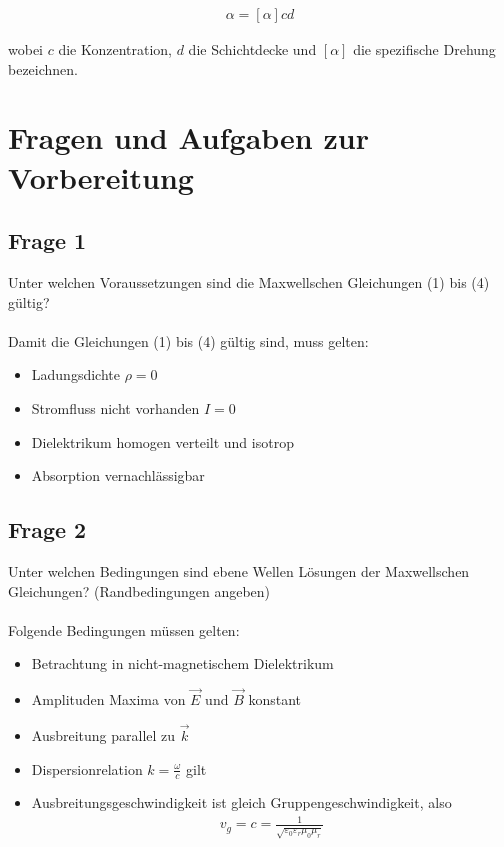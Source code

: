 \documentclass[a4paper,10pt]{scrartcl}
\begin{document}
			\begin{align}
			\alpha=[\alpha]cd
			\end{align} 
			
			wobei \(c\) die Konzentration, \(d\) die Schichtdecke und \([\alpha]\) die spezifische Drehung bezeichnen.
			
			\newpage
			
	\section{Fragen und Aufgaben zur Vorbereitung}
		\subsection{Frage 1}
			Unter welchen Voraussetzungen sind die Maxwellschen Gleichungen (1) bis (4) gültig?\\
			\\
			Damit die Gleichungen (1) bis (4) gültig sind, muss gelten:
			
			\begin{itemize}
				\item Ladungsdichte \(\rho=0\)
				\item Stromfluss nicht vorhanden \(I=0\)
				\item Dielektrikum homogen verteilt und isotrop
				\item Absorption vernachlässigbar
			\end{itemize}
			
		\subsection{Frage 2}
			Unter welchen Bedingungen sind ebene Wellen Lösungen der Maxwellschen Gleichungen?
			(Randbedingungen angeben)\\
			\\
			Folgende Bedingungen müssen gelten:
		
			\begin{itemize}
				\item Betrachtung in nicht-magnetischem Dielektrikum
				\item Amplituden Maxima von \(\vec{E}\) und \(\vec{B}\) konstant
				\item Ausbreitung parallel zu \(\vec{k}\)
				\item Dispersionrelation \(k=\frac{\omega}{c}\) gilt
				\item Ausbreitungsgeschwindigkeit ist gleich Gruppengeschwindigkeit, also\\
				\begin{align*}
				v_{g}=c=\frac{1}{\sqrt{\varepsilon_{0}\varepsilon_{r}\mu_{0}\mu_{r}}}
				\end{align*}
			\end{itemize}
		
\end{document}
